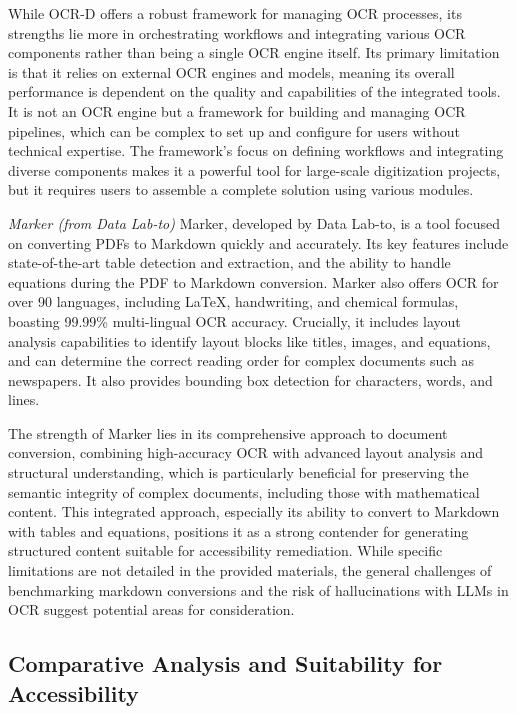 While OCR-D offers a robust framework for managing OCR processes, its strengths lie more in orchestrating workflows and integrating various OCR components rather than being a single OCR engine itself. Its primary limitation is that it relies on external OCR engines and models, meaning its overall performance is dependent on the quality and capabilities of the integrated tools. It is not an OCR engine but a framework for building and managing OCR pipelines, which can be complex to set up and configure for users without technical expertise. The framework's focus on defining workflows and integrating diverse components makes it a powerful tool for large-scale digitization projects, but it requires users to assemble a complete solution using various modules.

\emph{Marker (from Data Lab-to)}
Marker, developed by Data Lab-to, is a tool focused on converting PDFs to Markdown quickly and accurately. \cite{Marker} Its key features include state-of-the-art table detection and extraction, and the ability to handle equations during the PDF to Markdown conversion. \cite{Marker} Marker also offers OCR for over 90 languages, including LaTeX, handwriting, and chemical formulas, boasting 99.99\% multi-lingual OCR accuracy. \cite{Marker} Crucially, it includes layout analysis capabilities to identify layout blocks like titles, images, and equations, and can determine the correct reading order for complex documents such as newspapers. \cite{Marker} It also provides bounding box detection for characters, words, and lines. \cite{Marker}

The strength of Marker lies in its comprehensive approach to document conversion, combining high-accuracy OCR with advanced layout analysis and structural understanding, which is particularly beneficial for preserving the semantic integrity of complex documents, including those with mathematical content. This integrated approach, especially its ability to convert to Markdown with tables and equations, positions it as a strong contender for generating structured content suitable for accessibility remediation. While specific limitations are not detailed in the provided materials, the general challenges of benchmarking markdown conversions and the risk of hallucinations with LLMs in OCR suggest potential areas for consideration. \cite{HackerNewsMarker}

\subsection{Comparative Analysis and Suitability for Accessibility}

